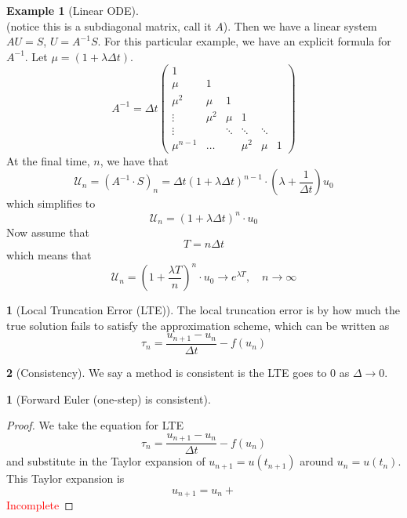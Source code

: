 \documentclass[12pt]{article}
\theoremstyle{definition}
\newtheorem{definition}{\color{NavyBlue}{\textbf{Definition}}}
\newtheorem{theorem}{\color{ForestGreen}{\textbf{Theorem}}}
\newcommand{\U}{\mathcal{U}}
\newtheorem{example}{\color{WildStrawberry}Example}
\theoremstyle{definition}
\begin{document}
\begin{example}[Linear ODE]
\begin{equation}
\end{equation}
(notice this is a subdiagonal matrix, call it $A$). Then we have a linear system $AU = S$, $U = A^{-1}S$. For this particular example, we have an explicit formula for $A^{-1}$. Let $\mu = \left(1 + \lambda \Delta t \right)$.
\begin{equation}
	A^{-1} = 
	\Delta t
	\begin{pmatrix}
	1 \\
	\mu & 1 \\
	\mu^2 & \mu & 1 \\
	\vdots & \mu^2 & \mu & 1 \\
	\vdots & & \ddots & \ddots &\ddots \\
	\mu^{n-1} &\hdots & &\mu^2 & \mu & 1
	\end{pmatrix}
\end{equation}
At the final time, $n$, we have that
\begin{equation}
	\U_n = (A^{-1} \cdot S)_n = \Delta t \left(1 + \lambda \Delta t \right)^{n-1} \cdot \left(\lambda + \frac{1}{\Delta t} \right) u_0
\end{equation}
which simplifies to
\begin{equation}
	\U_n = \left(1 + \lambda \Delta t \right)^{n} \cdot u_0
\end{equation}
Now assume that
\begin{equation}
	T = n \Delta t
\end{equation}
which means that
\begin{equation}
	\U_n = \left(1 + \frac{\lambda T}{n} \right)^{n} \cdot u_0 \to e^{\lambda T}, \quad n \to \infty
\end{equation}

\end{example}

\begin{definition}[Local Truncation Error (LTE)]
	The local truncation error is by how much the true solution fails to satisfy the approximation scheme, which can be written as
	\begin{equation}
		\tau_n = \frac{u_{n+1} - u_n}{\Delta t} - f(u_n)
	\end{equation}
\end{definition}

\begin{definition}[Consistency]
	We say a method is consistent is the LTE goes to 0 as $\Delta \to 0$.
\end{definition}

\begin{theorem}[Forward Euler (one-step) is consistent]
\end{theorem}
\begin{proof}
	We take the equation for LTE 
	\begin{equation}
		\tau_n = \frac{u_{n+1} - u_n}{\Delta t} - f(u_n)
	\end{equation}
	and substitute in the Taylor expansion of $u_{n+1} = u(t_{n+1})$ around $u_n = u(t_n)$. This Taylor expansion is
	\begin{equation}
		u_{n+1} = u_n + 
	\end{equation}
	\textcolor{red}{Incomplete}
\end{proof}
\end{document}
